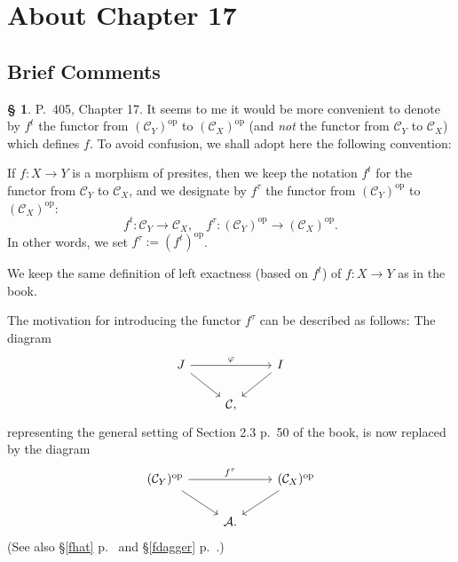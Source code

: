 \documentclass[12pt]{article}
\theoremstyle{remark}
\theoremstyle{definition}
\newtheorem{s}[thm]{\S}
\newcommand{\A}{\mathcal A}
\newcommand{\C}{\mathcal C}
\newcommand{\pp}{\varphi}
\DeclareMathOperator{\op}{op}
\begin{document}

\section{About Chapter 17}

\subsection{Brief Comments}

\begin{s}
P.~405, Chapter 17. It seems to me it would be more convenient to denote by $f^t$ the functor from $(\C_Y)^{\op}$ to $(\C_X)^{\op}$ (and {\em not} the functor from $\C_Y$ to $\C_X$) which defines $f$. To avoid confusion, we shall adopt here the following convention:

If $f:X\to Y$ is a morphism of presites,  then we keep the notation $f^t$ for the functor from $\C_Y$ to $\C_X$, and we designate by $f^\tau$  the functor from $(\C_Y)^{\op}$ to $(\C_X)^{\op}$:
\begin{equation}\label{ttau}
f^t:\C_Y\to\C_X,\quad f^\tau:(\C_Y)^{\op}\to(\C_X)^{\op}.
\end{equation}
In other words, we set $f^\tau:=(f^t)^{\op}$. 

We keep the same definition of left exactness (based on $f^t$) of $f:X\to Y$ as in the book.

The motivation for introducing the functor $f^\tau$ can be described as follows: The diagram 
$$
\begin{tikzcd}
J\ar{dr}\ar{rr}{\pp}&&I\ar{dl}\\ 
{}&\C,
\end{tikzcd}
$$ 
representing the general setting of Section 2.3 p.~50 of the book, is now replaced by the diagram 
$$
\begin{tikzcd}
(\C_Y)^{\op}\ar{dr}\ar{rr}{f^\tau}&&(\C_X)^{\op}\ar{dl}\\ 
{}&\A.
\end{tikzcd}
$$ 
(See also \S\ref{fhat} p.~\pageref{fhat} and \S\ref{fdagger} p.~\pageref{fdagger}.)
\end{s}

%
\end{document}
